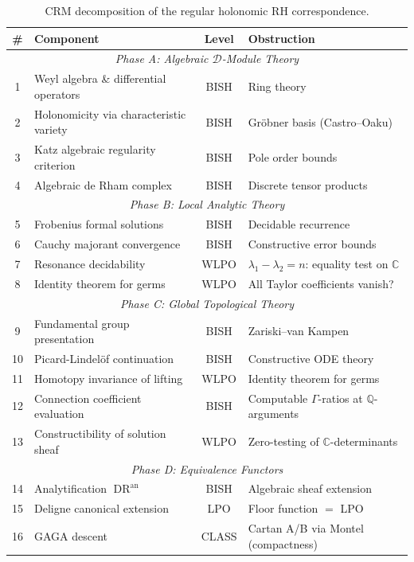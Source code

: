 \documentclass[11pt,a4paper]{article}
\theoremstyle{plain}
\theoremstyle{definition}
\newcommand{\BISH}{\textsf{BISH}}
\newcommand{\WLPO}{\textsf{WLPO}}
\newcommand{\LPO}{\textsf{LPO}}
\newcommand{\CLASS}{\textsf{CLASS}}
\newcommand{\Q}{\mathbb{Q}}
\newcommand{\C}{\mathbb{C}}
\DeclareMathOperator{\DR}{DR}
\begin{document}
\begin{table}[ht]
\centering
\caption{CRM decomposition of the regular holonomic RH correspondence.}
\label{tab:decomposition}
\small
\begin{tabular}{clcl}
\toprule
\# & Component & Level & Obstruction \\
\midrule
\multicolumn{4}{c}{\textit{Phase A: Algebraic $\mathcal{D}$-Module Theory}} \\
1 & Weyl algebra \& differential operators & \BISH & Ring theory \\
2 & Holonomicity via characteristic variety & \BISH & Gr\"obner basis (Castro--Oaku) \\
3 & Katz algebraic regularity criterion & \BISH & Pole order bounds \\
4 & Algebraic de Rham complex & \BISH & Discrete tensor products \\
\midrule
\multicolumn{4}{c}{\textit{Phase B: Local Analytic Theory}} \\
5 & Frobenius formal solutions & \BISH & Decidable recurrence \\
6 & Cauchy majorant convergence & \BISH & Constructive error bounds \\
7 & Resonance decidability & \WLPO & $\lambda_1 - \lambda_2 = n$: equality test on $\C$ \\
8 & Identity theorem for germs & \WLPO & All Taylor coefficients vanish? \\
\midrule
\multicolumn{4}{c}{\textit{Phase C: Global Topological Theory}} \\
9 & Fundamental group presentation & \BISH & Zariski--van Kampen \\
10 & Picard-Lindel\"of continuation & \BISH & Constructive ODE theory \\
11 & Homotopy invariance of lifting & \WLPO & Identity theorem for germs \\
12 & Connection coefficient evaluation & \BISH & Computable $\Gamma$-ratios at $\Q$-arguments \\
13 & Constructibility of solution sheaf & \WLPO & Zero-testing of $\C$-determinants \\
\midrule
\multicolumn{4}{c}{\textit{Phase D: Equivalence Functors}} \\
14 & Analytification $\DR^{\mathrm{an}}$ & \BISH & Algebraic sheaf extension \\
15 & Deligne canonical extension & \LPO & Floor function $=$ \LPO \\
16 & GAGA descent & \CLASS & Cartan A/B via Montel (compactness) \\
\bottomrule
\end{tabular}
\end{table}
\end{document}
